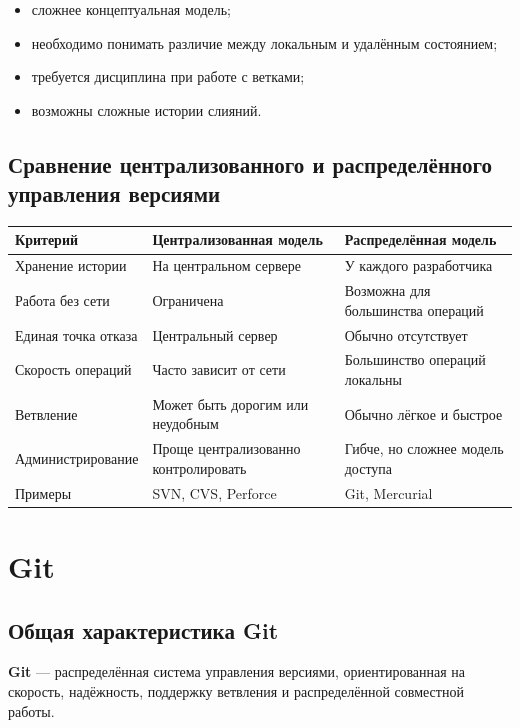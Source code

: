 \documentclass[12pt,a4paper]{article}
\begin{document}
\begin{itemize}
    \item сложнее концептуальная модель;
    \item необходимо понимать различие между локальным и удалённым состоянием;
    \item требуется дисциплина при работе с ветками;
    \item возможны сложные истории слияний.
\end{itemize}

\subsection{Сравнение централизованного и распределённого управления версиями}

\begin{center}
\begin{tabular}{|p{4cm}|p{5cm}|p{5cm}|}
\hline
\textbf{Критерий} & \textbf{Централизованная модель} & \textbf{Распределённая модель} \\
\hline
Хранение истории & На центральном сервере & У каждого разработчика \\
\hline
Работа без сети & Ограничена & Возможна для большинства операций \\
\hline
Единая точка отказа & Центральный сервер & Обычно отсутствует \\
\hline
Скорость операций & Часто зависит от сети & Большинство операций локальны \\
\hline
Ветвление & Может быть дорогим или неудобным & Обычно лёгкое и быстрое \\
\hline
Администрирование & Проще централизованно контролировать & Гибче, но сложнее модель доступа \\
\hline
Примеры & SVN, CVS, Perforce & Git, Mercurial \\
\hline
\end{tabular}
\end{center}

\section{Git}

\subsection{Общая характеристика Git}

\textbf{Git} --- распределённая система управления версиями, ориентированная на скорость, надёжность, поддержку ветвления и распределённой совместной работы.
\end{document}
